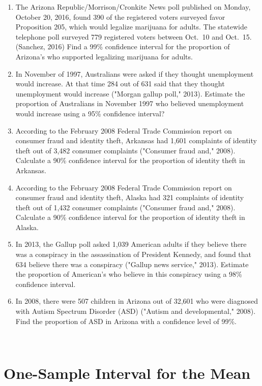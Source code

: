 \documentclass[
]{book}
\begin{document}
\begin{enumerate}
\def\labelenumi{\arabic{enumi}.}
\item
  The Arizona Republic/Morrison/Cronkite News poll published on Monday, October 20, 2016, found 390 of the registered voters surveyed favor Proposition 205, which would legalize marijuana for adults. The statewide telephone poll surveyed 779 registered voters between Oct.~10 and Oct.~15. (Sanchez, 2016) Find a 99\% confidence interval for the proportion of Arizona's who supported legalizing marijuana for adults.
\item
  In November of 1997, Australians were asked if they thought unemployment would increase. At that time 284 out of 631 said that they thought unemployment would increase ("Morgan gallup poll," 2013). Estimate the proportion of Australians in November 1997 who believed unemployment would increase using a 95\% confidence interval?
\item
  According to the February 2008 Federal Trade Commission report on consumer fraud and identity theft, Arkansas had 1,601 complaints of identity theft out of 3,482 consumer complaints ("Consumer fraud and," 2008). Calculate a 90\% confidence interval for the proportion of identity theft in Arkansas.
\item
  According to the February 2008 Federal Trade Commission report on consumer fraud and identity theft, Alaska had 321 complaints of identity theft out of 1,432 consumer complaints ("Consumer fraud and," 2008). Calculate a 90\% confidence interval for the proportion of identity theft in Alaska.
\item
  In 2013, the Gallup poll asked 1,039 American adults if they believe there was a conspiracy in the assassination of President Kennedy, and found that 634 believe there was a conspiracy ("Gallup news service," 2013). Estimate the proportion of American's who believe in this conspiracy using a 98\% confidence interval.
\item
  In 2008, there were 507 children in Arizona out of 32,601 who were diagnosed with Autism Spectrum Disorder (ASD) ("Autism and developmental," 2008). Find the proportion of ASD in Arizona with a confidence level of 99\%.
\end{enumerate}

\textbf{\\
}

\hypertarget{one-sample-interval-for-the-mean}{%
\section{One-Sample Interval for the Mean}\label{one-sample-interval-for-the-mean}}
\end{document}
